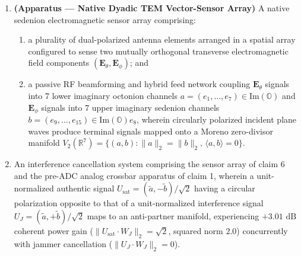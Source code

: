 \documentclass[12pt,letterpaper]{article}
\begin{document}
\begin{enumerate}[leftmargin=20pt,itemsep=4pt]
    \item \textbf{(Apparatus --- Native Dyadic TEM Vector-Sensor Array)} A native sedenion electromagnetic sensor array comprising:
    \begin{enumerate}[leftmargin=16pt,itemsep=1pt]
        \item a plurality of dual-polarized antenna elements arranged in a spatial array configured to sense two mutually orthogonal transverse electromagnetic field components $(\mathbf{E}_\theta, \mathbf{E}_\phi)$; and
        \item a passive RF beamforming and hybrid feed network coupling $\mathbf{E}_\theta$ signals into 7 lower imaginary octonion channels $a = (e_1,\dots,e_7) \in \mathrm{Im}(\mathbb{O})$ and $\mathbf{E}_\phi$ signals into 7 upper imaginary sedenion channels $b = (e_9,\dots,e_{15}) \in \mathrm{Im}(\mathbb{O})e_8$, wherein circularly polarized incident plane waves produce terminal signals mapped onto a Moreno zero-divisor manifold $V_2(\mathbb{R}^7) = \{(a,b) : \|a\|_2 = \|b\|_2,\, \langle a, b \rangle = 0\}$.
    \end{enumerate}

    \item An interference cancellation system comprising the sensor array of claim 6 and the pre-ADC analog crossbar apparatus of claim 1, wherein a unit-normalized authentic signal $U_{\mathrm{sat}} = (\tilde{a}, -\tilde{b})/\sqrt{2}$ having a circular polarization opposite to that of a unit-normalized interference signal $U_J = (\tilde{a}, +\tilde{b})/\sqrt{2}$ maps to an anti-partner manifold, experiencing $+3.01\text{ dB}$ coherent power gain ($\|U_{\mathrm{sat}}\cdot W_J\|_2 = \sqrt{2}$, squared norm $2.0$) concurrently with jammer cancellation ($\|U_J\cdot W_J\|_2 = 0$).


\end{enumerate}
\end{document}
